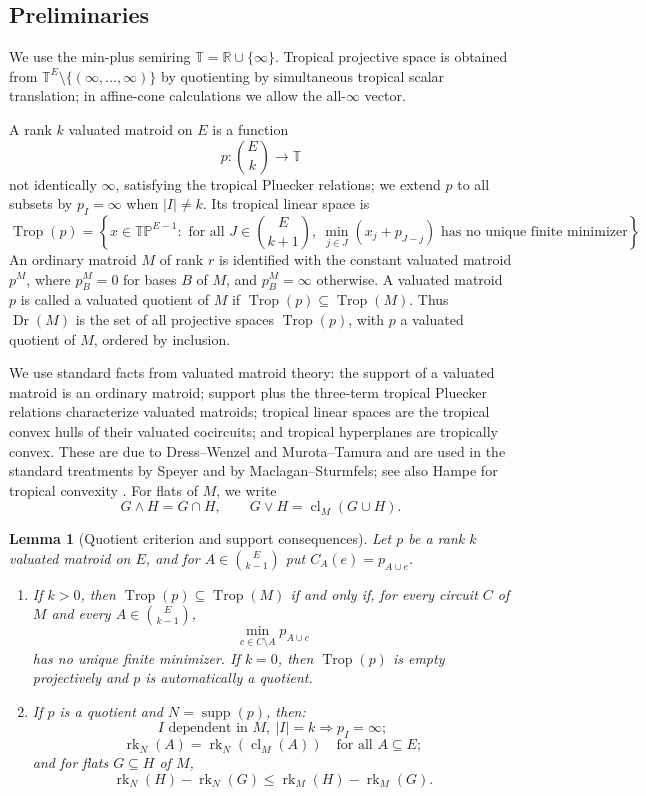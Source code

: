 \documentclass[12pt]{article}
\newtheorem{lemma}[theorem]{Lemma}
\theoremstyle{definition}
\newcommand{\T}{\mathbb T}
\newcommand{\TP}{\mathbb{TP}}
\newcommand{\Trop}{\operatorname{Trop}}
\newcommand{\Dr}{\operatorname{Dr}}
\newcommand{\rk}{\operatorname{rk}}
\newcommand{\cl}{\operatorname{cl}}
\newcommand{\supp}{\operatorname{supp}}
\newcommand{\binomE}[1]{\binom{E}{#1}}
\begin{document}
\subsection*{Preliminaries}

We use the min-plus semiring \(\T=\mathbb R\cup\{\infty\}\).  Tropical projective space is obtained from \(\T^E\setminus\{(\infty,\ldots,\infty)\}\) by quotienting by simultaneous tropical scalar translation; in affine-cone calculations we allow the all-\(\infty\) vector.

A rank \(k\) valuated matroid on \(E\) is a function
\[
p:\binom{E}{k}\to \T
\]
not identically \(\infty\), satisfying the tropical Pluecker relations; we extend \(p\) to all subsets by \(p_I=\infty\) when \(|I|\ne k\).  Its tropical linear space is
\[
\Trop(p)=
\left\{
x\in \TP^{E-1}:
\text{ for all }J\in\binomE{k+1},\ 
\min_{j\in J}(x_j+p_{J-j})\text{ has no unique finite minimizer}
\right\}.
\]
An ordinary matroid \(M\) of rank \(r\) is identified with the constant valuated matroid \(p^M\), where \(p^M_B=0\) for bases \(B\) of \(M\), and \(p^M_B=\infty\) otherwise.  A valuated matroid \(p\) is called a valuated quotient of \(M\) if \(\Trop(p)\subseteq \Trop(M)\).  Thus \(\Dr(M)\) is the set of all projective spaces \(\Trop(p)\), with \(p\) a valuated quotient of \(M\), ordered by inclusion.

We use standard facts from valuated matroid theory: the support of a valuated matroid is an ordinary matroid; support plus the three-term tropical Pluecker relations characterize valuated matroids; tropical linear spaces are the tropical convex hulls of their valuated cocircuits; and tropical hyperplanes are tropically convex.  These are due to Dress--Wenzel and Murota--Tamura and are used in the standard treatments by Speyer and by Maclagan--Sturmfels; see also Hampe for tropical convexity \cite{DW92,MT01,Speyer08,MS15,Hampe15}.  For flats of \(M\), we write
\[
G\wedge H=G\cap H,\qquad G\vee H=\cl_M(G\cup H).
\]

\begin{lemma}[Quotient criterion and support consequences]\label{lem:quotient}
Let \(p\) be a rank \(k\) valuated matroid on \(E\), and for \(A\in\binomE{k-1}\) put \(C_A(e)=p_{A\cup e}\).
\begin{enumerate}
\item If \(k>0\), then \(\Trop(p)\subseteq \Trop(M)\) if and only if, for every circuit \(C\) of \(M\) and every \(A\in\binomE{k-1}\),
\[
\min_{c\in C\setminus A}p_{A\cup c}
\]
has no unique finite minimizer.  If \(k=0\), then \(\Trop(p)\) is empty projectively and \(p\) is automatically a quotient.
\item If \(p\) is a quotient and \(N=\supp(p)\), then:
\[
I\text{ dependent in }M,\ |I|=k \Longrightarrow p_I=\infty;
\]
\[
\rk_N(A)=\rk_N(\cl_M(A))\quad\text{for all }A\subseteq E;
\]
and for flats \(G\subseteq H\) of \(M\),
\[
\rk_N(H)-\rk_N(G)\le \rk_M(H)-\rk_M(G).
\]
\end{enumerate}
\end{lemma}
\end{document}
